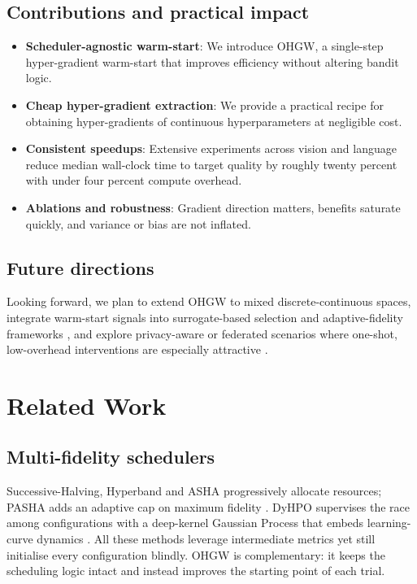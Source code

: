 \documentclass{article}
\begin{document}
\subsection{Contributions and practical impact}
\begin{itemize}
  \item \textbf{Scheduler-agnostic warm-start}: We introduce OHGW, a single-step hyper-gradient warm-start that improves efficiency without altering bandit logic.
  \item \textbf{Cheap hyper-gradient extraction}: We provide a practical recipe for obtaining hyper-gradients of continuous hyperparameters at negligible cost.
  \item \textbf{Consistent speedups}: Extensive experiments across vision and language reduce median wall-clock time to target quality by roughly twenty percent with under four percent compute overhead.
  \item \textbf{Ablations and robustness}: Gradient direction matters, benefits saturate quickly, and variance or bias are not inflated.
\end{itemize}

\subsection{Future directions}
Looking forward, we plan to extend OHGW to mixed discrete-continuous spaces, integrate warm-start signals into surrogate-based selection \cite{khazi-2023-deep} and adaptive-fidelity frameworks \cite{jiang-2024-efficient}, and explore privacy-aware or federated scenarios where one-shot, low-overhead interventions are especially attractive \cite{panda-2022-new,khodak-2021-federated}.

\section{Related Work}
\subsection{Multi-fidelity schedulers}
Successive-Halving, Hyperband and ASHA progressively allocate resources; PASHA adds an adaptive cap on maximum fidelity \cite{bohdal-2022-pasha}. DyHPO supervises the race among configurations with a deep-kernel Gaussian Process that embeds learning-curve dynamics \cite{wistuba-2022-supervising}. All these methods leverage intermediate metrics yet still initialise every configuration blindly. OHGW is complementary: it keeps the scheduling logic intact and instead improves the starting point of each trial.
\end{document}
